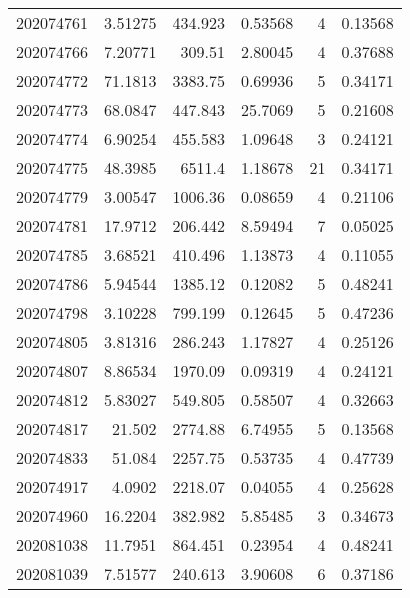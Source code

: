 \begin{tabular}{rrrrrr}
 202074761 &          3.51275 &      434.923  &            0.53568 &           4 & 0.13568 \\
 202074766 &          7.20771 &      309.51   &            2.80045 &           4 & 0.37688 \\
 202074772 &         71.1813  &     3383.75   &            0.69936 &           5 & 0.34171 \\
 202074773 &         68.0847  &      447.843  &           25.7069  &           5 & 0.21608 \\
 202074774 &          6.90254 &      455.583  &            1.09648 &           3 & 0.24121 \\
 202074775 &         48.3985  &     6511.4    &            1.18678 &          21 & 0.34171 \\
 202074779 &          3.00547 &     1006.36   &            0.08659 &           4 & 0.21106 \\
 202074781 &         17.9712  &      206.442  &            8.59494 &           7 & 0.05025 \\
 202074785 &          3.68521 &      410.496  &            1.13873 &           4 & 0.11055 \\
 202074786 &          5.94544 &     1385.12   &            0.12082 &           5 & 0.48241 \\
 202074798 &          3.10228 &      799.199  &            0.12645 &           5 & 0.47236 \\
 202074805 &          3.81316 &      286.243  &            1.17827 &           4 & 0.25126 \\
 202074807 &          8.86534 &     1970.09   &            0.09319 &           4 & 0.24121 \\
 202074812 &          5.83027 &      549.805  &            0.58507 &           4 & 0.32663 \\
 202074817 &         21.502   &     2774.88   &            6.74955 &           5 & 0.13568 \\
 202074833 &         51.084   &     2257.75   &            0.53735 &           4 & 0.47739 \\
 202074917 &          4.0902  &     2218.07   &            0.04055 &           4 & 0.25628 \\
 202074960 &         16.2204  &      382.982  &            5.85485 &           3 & 0.34673 \\
 202081038 &         11.7951  &      864.451  &            0.23954 &           4 & 0.48241 \\
 202081039 &          7.51577 &      240.613  &            3.90608 &           6 & 0.37186 \\

\end{tabular}
